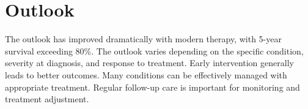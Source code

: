 \section{Outlook}
The outlook has improved dramatically with modern therapy, with 5-year survival exceeding 80\%. The outlook varies depending on the specific condition, severity at diagnosis, and response to treatment. Early intervention generally leads to better outcomes. Many conditions can be effectively managed with appropriate treatment. Regular follow-up care is important for monitoring and treatment adjustment.
